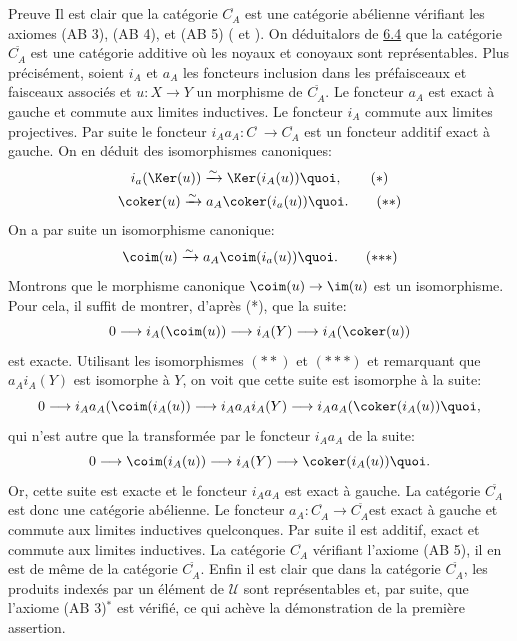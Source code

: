 \begin{enonce*}[remark]{Preuve}
Il est clair que la catégorie $C^{\widehat{\phantom{,}}}_A$ est une
catégorie abélienne vérifiant les axiomes (AB 3), (AB 4), et (AB 5)
( et ). On déduit\pageoriginale alors
de \hyperref[II.prop6.4]{6.4} que la catégorie $C^{\widetilde{\phantom{,}}}_A$
est une catégorie additive où les noyaux et conoyaux sont
représentables. Plus précisément, soient $i_A$ et $a_A$ les
foncteurs inclusion dans les préfaisceaux et faisceaux associés et
$u:X\rightarrow Y$ un morphisme de $C^{\widetilde{\phantom{,}}}_A$.
Le foncteur $a_A$ est exact à gauche et commute aux limites
inductives. Le foncteur $i_A$ commute aux limites projectives. Par
suite le foncteur $i_A a_A:C^{\widehat{\phantom{,}}}\rightarrow
C^{\widehat{\phantom{,}}}_A$ est un foncteur additif exact à gauche.
On en déduit des isomorphismes canoniques:
\begin{gather*}
i_a(\Ker(u))\xrightarrow{\sim} \Ker(i_A(u)){\quoi},\tag{$\ast$}\\
\coker(u)\xrightarrow{\sim} a_A \coker
(i_a(u)){\quoi}.\tag{${\ast}{\ast}$}
\end{gather*}
On a par suite un isomorphisme canonique:
\begin{equation}\coim(u)\xrightarrow{\sim} a_A \coim (i_a (u)){\quoi}.
\tag{${\ast}{\ast}{\ast}$}
\end{equation}
Montrons que le morphisme canonique $\coim(u)\rightarrow \im(u)$ est
un isomorphisme. Pour cela, il suffit de montrer, d'après (*), que
la suite:
$$
0\longrightarrow i_A(\coim(u))\longrightarrow i_A(Y)\longrightarrow
i_A(\coker(u))
$$
est exacte. Utilisant les isomorphismes $({\ast}{\ast})$ et
$({\ast}{\ast}{\ast})$ et remarquant que $a_A i_A(Y)$ est isomorphe
à $Y$, on voit que cette suite est isomorphe à la suite:
$$
0\longrightarrow i_A a_A(\coim(i_A(u))\longrightarrow i_A a_A i_A
(Y)\longrightarrow i_A a_A (\coker(i_A (u)){\quoi},
$$
qui n'est autre que la transformée par le foncteur $i_Aa_A$ de la
suite:
$$
0\longrightarrow \coim(i_A (u))\longrightarrow i_A(Y)\longrightarrow
\coker (i_A(u)){\quoi}.
$$
Or, cette suite est exacte et le foncteur $i_Aa_A$ est exact à
gauche. La catégorie $C^{\widetilde{\phantom{,}}}_A$ est donc une
catégorie abélienne. Le foncteur
$a_A:C^{\widehat{\phantom{,}}}_A\rightarrow
C^{\widetilde{\phantom{,}}}_A$\pageoriginale est exact à gauche et
commute aux limites inductives quelconques. Par suite il est
additif, exact et commute aux limites inductives. La catégorie
$C^{\widehat{\phantom{,}}}_A$ vérifiant l'axiome (AB 5), il en est
de même de la catégorie $C^{\widetilde{\phantom{,}}}_A$. Enfin
il est clair que dans la catégorie
$C^{\widetilde{\phantom{,}}}_A$, les produits indexés par un
élément de $𝒰$ sont représentables et, par suite, que
l'axiome (AB 3)$^{\ast}$ est vérifié, ce qui achève la
démonstration de la première assertion.
\end{enonce*}

